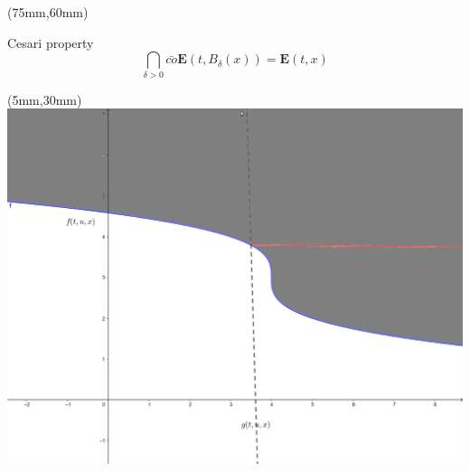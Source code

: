 \begin{frame}[plain]
{		\begin{textblock*}{50mm}(75mm,60mm)
			\begin{yellowbox}{Cesari property}
				\begin{equation*}
				\bigcap_{\delta>0}\bar{co}\mathbf{E}(t,B_{\delta}(x))=\mathbf{E}(t,x)
				\end{equation*}			
			\end{yellowbox}
		\end{textblock*}
	}
	{
		\begin{textblock*}{60mm}(5mm,30mm)
			\includegraphics[width=\linewidth]{Feathergraphics/Conjunto_E.eps}
		\end{textblock*}
	}
\end{frame}

